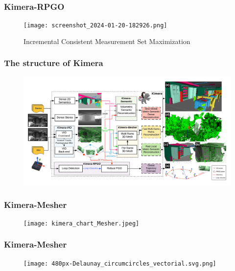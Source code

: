 \documentclass[11pt]{beamer}
\begin{document}
\begin{frame}
    \frametitle{Kimera-RPGO} 
\begin{figure}
    \texttt{[image: screenshot\_2024-01-20-182926.png]} 
    \caption{Incremental
    Consistent Measurement Set Maximization \cite{PCM}}
\end{figure}
\end{frame}
\begin{frame}
\frametitle{The structure of Kimera}
\begin{figure}
    \includegraphics[width=\linewidth]{kimera_chart_23.jpeg} 
\end{figure}
\end{frame}
\begin{frame}
\frametitle{Kimera-Mesher}
\begin{figure}
    \texttt{[image: kimera\_chart\_Mesher.jpeg]} 
\end{figure}
\end{frame}
\begin{frame}
\frametitle{Kimera-Mesher}
\begin{minipage}{0.49\textwidth}
    \begin{figure}
        \texttt{[image: 480px-Delaunay\_circumcircles\_vectorial.svg.png]} 
    \end{figure}
\end{minipage}
\begin{minipage}{0.49\textwidth}
    \begin{figure}[ht]
        \centering
    \end{figure}
\end{minipage}
\end{frame}
\end{document}
